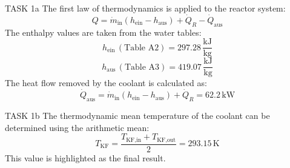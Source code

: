 TASK 1a  
The first law of thermodynamics is applied to the reactor system:  
\[
Q = \dot{m}_{\text{in}} (h_{\text{ein}} - h_{\text{aus}}) + \dot{Q}_R - \dot{Q}_{\text{aus}}
\]  
The enthalpy values are taken from the water tables:  
\[
h_{\text{ein}} \, (\text{Table A2}) = 297.28 \, \frac{\text{kJ}}{\text{kg}}
\]  
\[
h_{\text{aus}} \, (\text{Table A3}) = 419.07 \, \frac{\text{kJ}}{\text{kg}}
\]  
The heat flow removed by the coolant is calculated as:  
\[
\dot{Q}_{\text{aus}} = \dot{m}_{\text{in}} (h_{\text{ein}} - h_{\text{aus}}) + \dot{Q}_R = 62.2 \, \text{kW}
\]  

TASK 1b  
The thermodynamic mean temperature of the coolant can be determined using the arithmetic mean:  
\[
T_{\text{KF}} = \frac{T_{\text{KF,in}} + T_{\text{KF,out}}}{2} = 293.15 \, \text{K}
\]  
This value is highlighted as the final result.